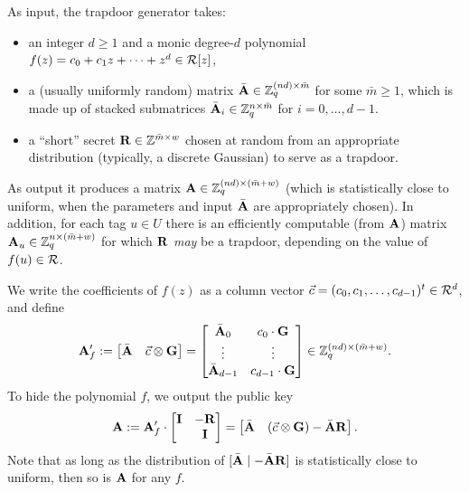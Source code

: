As input, the trapdoor generator takes:
\begin{itemize}[itemsep=0pt]
\item an integer $d \geq 1$ and a monic degree-$d$ polynomial $f(z) =
  c_{0} + c_{1} z + \cdots + z^{d} \in \mathcal{R}[z]$,
\item a (usually uniformly random) matrix $\bar{\mathbf{A}} \in \mathbb{Z}_q^{(nd)
    \times \bar{m}}$ for some $\bar{m} \geq 1$, which is made up of
  stacked submatrices $\bar{\mathbf{A}}_{i} \in \mathbb{Z}_q^{n \times \bar{m}}$ for
  $i=0,\ldots,d-1$.
\item  a ``short'' secret
$\mathbf{R} \in \mathbb{Z}^{\bar{m} \times w}$ chosen at random from an appropriate
distribution (typically, a discrete Gaussian) to serve as a trapdoor.
\end{itemize}
As output it produces a matrix $\mathbf{A} \in \mathbb{Z}_q^{(nd) \times
  (\bar{m}+w)}$ (which is statistically close to uniform, when the
parameters and input $\bar{\mathbf{A}}$ are appropriately chosen).  In addition, for
each tag $u \in U$ there is an efficiently computable (from $\mathbf{A}$)
matrix $\mathbf{A}_{u} \in \mathbb{Z}_q^{n \times (\bar{m}+w)}$ for which $\mathbf{R}$
\emph{may} be a trapdoor, depending on the value of $f(u) \in \mathcal{R}$.

We write the coefficients of $f(z)$ as a column vector $\vec{c} =
(c_{0}, c_{1}, \ldots, c_{d-1})^{t} \in \mathcal{R}^{d}$, and define
\[ \mathbf{A}'_{f} :=
\begin{bmatrix}
  \bar{\mathbf{A}} & \vec{c} \otimes \mathbf{G}
\end{bmatrix}
=
\begin{bmatrix}
  \bar{\mathbf{A}}_{0} & c_{0} \cdot \mathbf{G} \\
  \vdots & \vdots \\
  \bar{\mathbf{A}}_{d-1} & c_{d-1} \cdot \mathbf{G}
\end{bmatrix} \in \mathbb{Z}_q^{(nd) \times (\bar{m}+w)}.
\]
To hide the polynomial $f$, we output the public key
\[ \mathbf{A} := \mathbf{A}'_{f} \cdot
\begin{bmatrix}
  \mathbf{I} & -\mathbf{R} \\ & \mathbf{I}
\end{bmatrix}
=
\begin{bmatrix}
  \bar{\mathbf{A}} & (\vec{c} \otimes \mathbf{G}) - \bar{\mathbf{A}} \mathbf{R}
\end{bmatrix}.
\]
Note that as long as the distribution of $[\bar{\mathbf{A}} \mid
-\bar{\mathbf{A}} \mathbf{R}]$ is statistically close to uniform, then so is
$\mathbf{A}$ for any $f$.

